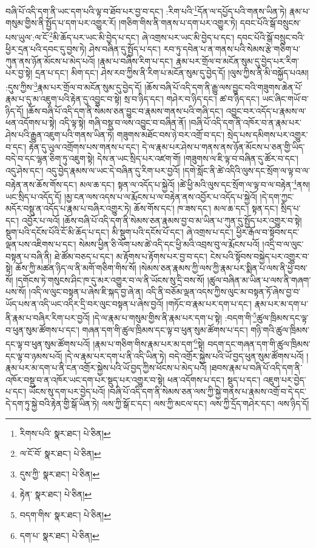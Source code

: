 བཞི་པོ་འདི་དག་ནི་ཡང་དག་པའི་ལྟ་བ་ཐོབ་པར་བྱ་བ་དང་། :རིག་པའི་\footnote{རིགས་པའི་  སྣར་ཐང་།  པེ་ཅིན། }དོན་ལ་དཔྱོད་པའི་གནས་ཡིན་ཏེ། རྣམ་པ་གསུམ་གྱིས་ནི་སྤྱོད་པ་དག་པར་འགྱུར་རོ། །གཅིག་གིས་ནི་གནས་པ་དག་པར་འགྱུར་ཏེ། དབང་པོའི་སྒོ་བསྲུངས་པས་ཡུལ་:ལ་ངོ་\footnote{ལ་ངོ་བོ་  སྣར་ཐང་།  པེ་ཅིན། }མི་ཆོད་པར་ཡང་མི་བྱེད་པ་དང་། ཞེ་འགྲས་པར་ཡང་མི་བྱེད་པ་དང་། དབང་པོའི་སྒོ་བསྲུང་བའི་ཕྱིར་དྲན་པའི་དབང་དུ་བྱས་ཏེ། ཤེས་བཞིན་དུ་སྤྱོད་པ་དང་། རབ་ཏུ་དབེན་པ་ན་གནས་པའི་སེམས་རྩེ་གཅིག་པ་ཀུན་ནས་ཉོན་མོངས་པ་མེད་པའོ། །རྣམ་པ་བཞིས་རིག་པ་དང་། རྣམ་པར་གྲོལ་བ་མངོན་སུམ་དུ་བྱེད་པར་རིག་པར་བྱ་སྟེ། དྲན་པ་དང་། མིག་དང་། ཤེས་རབ་ཀྱིས་ནི་རིག་པ་མངོན་སུམ་དུ་བྱེད་དོ། །ལུས་ཀྱིས་ནི་མི་བསྐྱོད་པའམ། :དུས་ཀྱིས་\footnote{དུས་ཀྱི་  སྣར་ཐང་།  པེ་ཅིན། }རྣམ་པར་གྲོལ་བ་མངོན་སུམ་དུ་བྱེད་དོ། །ཆོས་བཞི་པོ་འདི་དག་ནི་རྒྱུ་ལས་བྱུང་བའི་གཟུགས་ཆེན་པོ་རྣམ་པ་དུ་མ་འཇུག་པའི་རྟེན་དུ་འབྱུང་བ་སྟེ། སྲ་བ་ཉིད་དང་། གཤེར་བ་ཉིད་དང་། ཚ་བ་ཉིད་དང་། ཡང་ཞིང་གཡོ་བ་ཉིད་དོ། །ཆོས་བཞི་པོ་འདི་དག་ནི་སེམས་ཅན་བྱུང་བ་རྣམས་གནས་པའི་གཞི་དང་། འབྱུང་བར་འདོད་པ་རྣམས་ལ་ཕན་འདོགས་པ་སྟེ། འདི་ལྟ་སྟེ། གཞི་བསྡུ་བ་ལས་འབྱུང་བ་བཞིན་ནོ། །བཞི་པོ་འདི་དག་ནི་འཁོར་བ་ན་རྣམ་པར་ཤེས་པའི་རྒྱུན་འཇུག་པའི་གནས་ཡིན་ཏེ། གཟུགས་མཐོང་བས་ཉེ་བར་འགྲོ་བ་དང་། སྲེད་པས་དམིགས་པར་འགྱུར་བ་དང་། རྟེན་དུ་ཡུལ་འགྲོགས་པས་གནས་པ་དང་། དེ་ལ་རྣམ་པར་ཤེས་པ་གནས་ནས་ཉོན་མོངས་པ་ཅན་གྱི་ཡིད་བདེ་བ་དང་ལྷན་ཅིག་ཏུ་འཇུག་སྟེ། དེས་ན་ཡང་སྲིད་པར་འཛག་གོ། །གཟུགས་ལ་ཇི་ལྟ་བ་བཞིན་དུ་ཚོར་བ་དང་། འདུ་ཤེས་དང་། འདུ་བྱེད་རྣམས་ལ་ཡང་དེ་བཞིན་དུ་རིག་པར་བྱའོ། །དགེ་སློང་ནི་ཚེ་འདིའི་ལུས་དང་སྲོག་ལ་ལྟ་བ་ལ་བརྟེན་ནས་ཆོས་གོས་དང་། མལ་ཆ་དང་། སྟན་ལ་འདོད་པ་སྐྱེའོ། །ཚེ་ཕྱི་མའི་ལུས་དང་སྲོག་ལ་ལྟ་བ་ལ་བརྟེན་\footnote{རྟེན་  སྣར་ཐང་།  པེ་ཅིན། }ནས། ཡང་སྲིད་པ་འདོད་དོ། །མྱ་ངན་ལས་འདས་པ་ལ་རྨོངས་པ་ལ་བརྟེན་ནས་འབྱོར་པ་འདོད་པ་སྐྱེའོ། །དེ་དག་ཀྱང་མདོར་བསྡུ་ན་འདོད་པ་རྣམ་པ་བཞིར་འགྱུར་ཏེ། ཆོས་གོས་དང་། ཁ་ཟས་དང་། མལ་ཆ་དང་། སྟན་དང་། སྲིད་པ་དང་། འབྱོར་པ་ལའོ། །ཆོས་བཞི་པོ་འདི་དག་ནི་སེམས་ཅན་རྣམས་བྱ་བ་མ་ཡིན་པ་ཀུན་དུ་སྤྱོད་པར་འགྱུར་བ་སྟེ། སྡུག་པའི་དངོས་པོའི་ངོ་མི་ཆོད་པ་དང་། མི་སྡུག་པའི་དངོས་པོ་དང་། ཞེ་འགྲས་པ་དང་། ཕྱིར་རྒོལ་བ་སྟོབས་དང་ལྡན་པས་འཇིགས་པ་དང་། སེམས་ཕྱིན་ཅི་ལོག་པས་ཚེ་འདི་དང་ཕྱི་མའི་འབྲས་བུ་ལ་རྨོངས་པའོ། །འདྲི་བ་ལ་ལུང་བསྟན་པ་བཞི་ནི། ཐེ་ཚོམ་བཅད་པ་དང་། མ་རྟོགས་པ་རྟོགས་པར་བྱ་བ་དང་། ངེས་པའི་སྟོབས་བསྐྱེད་པར་འགྱུར་བ་སྟེ། ཆོས་ཀྱི་མཚན་ཉིད་ལ་ནི་མགོ་གཅིག་གིས་སོ། །སེམས་ཅན་རྣམས་ཀྱི་ལས་ཀྱི་རྣམ་པར་སྨིན་པ་ལས་ནི་ཕྱེ་བས་སོ། །དགོངས་ཏེ་གསུངས་ཤིང་ཁ་དུ་མར་འགྱུར་བ་ལ་ནི་ཡོངས་སུ་དྲི་བས་སོ། །ཚུལ་བཞིན་མ་ཡིན་པ་ལས་ནི་གཞག་པས་སོ། །འདི་ལ་ལུང་བསྟན་པ་ཞེས་ཇི་སྐད་བྱ་ཞེ་ན། འདི་ནི་བཅོམ་ལྡན་འདས་ཀྱིས་ལུང་མ་བསྟན་ཏོ་ཞེས་བྱ་བ་ཡོད་པས་ན་འདི་ཡང་འདིར་དྲི་བར་ལུང་བསྟན་པ་ཞེས་བྱའོ། །གཏོང་བ་རྣམ་པར་དག་པ་དང་། རྣམ་པར་མ་དག་པ་ནི་རྣམ་པ་བཞིར་རིག་པར་བྱའོ། །དེ་ལ་རྣམ་པ་གསུམ་གྱིས་ནི་རྣམ་པར་དག་པ་སྟེ། :བདག་གི་\footnote{བདག་གིས་  སྣར་ཐང་།  པེ་ཅིན། }ཚུལ་ཁྲིམས་དང་ལྟ་བ་ཕུན་སུམ་ཚོགས་པ་དང་། གཞན་དག་གི་ཚུལ་ཁྲིམས་དང་ལྟ་བ་ཕུན་སུམ་ཚོགས་པ་དང་། གཉི་གའི་ཚུལ་ཁྲིམས་དང་ལྟ་བ་ཕུན་སུམ་ཚོགས་པའོ། །རྣམ་པ་གཅིག་གིས་རྣམ་པར་མ་དག་\footnote{དག་པ་  སྣར་ཐང་།  པེ་ཅིན། }སྟེ། བདག་དང་གཞན་དག་གི་ཚུལ་ཁྲིམས་དང་ལྟ་བ་ཉམས་པའོ། །དེ་ལ་རྣམ་པར་དག་པ་ནི་འདི་ཡིན་ཏེ། བདེ་འགྲོར་སྐྱེས་པའི་ཡོ་བྱད་ཕུན་སུམ་ཚོགས་པའོ། །རྣམ་པར་མ་དག་པ་ནི་ངན་འགྲོར་སྐྱེས་པའི་ཡོ་བྱད་ཀྱིས་ཕོངས་པ་མེད་པའོ། །ཐབས་རྣམ་པ་བཞི་པོ་འདི་དག་ནི་འཁོར་བསྡུ་བ་ན་འཁོར་ཡང་དག་པར་སྡུད་པར་འགྱུར་བ་སྟེ། ཕན་འདོགས་པ་དང་། སྡུད་པ་དང་། འཇུག་པར་བྱེད་པ་དང་། ཡོངས་སུ་དག་པར་བྱེད་པའོ། །བཞི་པོ་འདི་དག་ནི་སེམས་ཅན་ལས་ཀྱི་སྐྱེ་གནས་པ་རྣམས་འགྲོ་བ་དེ་དང་དེ་དག་ཏུ་སྐྱེ་བའི་རྟེན་གྱི་སྒོ་ཡིན་ཏེ། ལས་ཀྱི་སྒོ་ང་དང་། ལས་ཀྱི་མངལ་དང་། ལས་ཀྱི་དྲོད་གཤེར་དང་། ལས་ཉིད་དོ། 